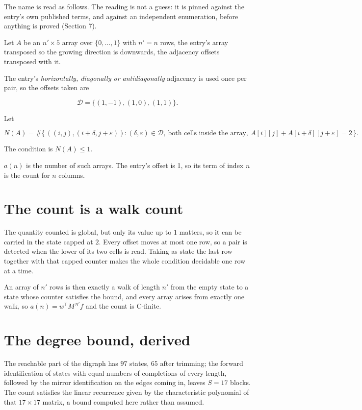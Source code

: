 \documentclass[11pt]{article}
\theoremstyle{definition}
\begin{document}
The name is read as follows. The reading is not a guess: it is pinned against the entry's own published terms, and against an independent enumeration, before anything is proved (Section 7).

Let $A$ be an $n' \times 5$ array over $\{0,\dots,1\}$ with $n' = n$ rows, the entry's array transposed so the growing direction is downwards, the adjacency offsets transposed with it.

The entry's {\itshape horizontally, diagonally or antidiagonally} adjacency is used once per pair, so the offsets taken are

\[\mathcal{D} = \{(1,-1), (1,0), (1,1)\}.\]

Let

\[N(A) = \#\bigl\{\,((i,j),(i{+}\delta,j{+}\varepsilon)) : (\delta,\varepsilon) \in \mathcal{D},\ \text{both cells inside the array},\ A[i][j] + A[i{+}\delta][j{+}\varepsilon] = 2\,\bigr\}.\]

The condition is $N(A) \le 1$.

$a(n)$ is the number of such arrays. The entry's offset is 1, so its term of index $n$ is the count for $n$ columns.

\section{The count is a walk count}

The quantity counted is global, but only its value up to $1$ matters, so it can be carried in the state capped at $2$. Every offset moves at most one row, so a pair is detected when the lower of its two cells is read. Taking as state the last row together with that capped counter makes the whole condition decidable one row at a time.

An array of $n'$ rows is then exactly a walk of length $n'$ from the empty state to a state whose counter satisfies the bound, and every array arises from exactly one walk, so $a(n) = w^{\mathsf T}M^{\,n'}f$ and the count is C-finite.

\section{The degree bound, derived}

The reachable part of the digraph has $97$ states, $65$ after trimming; the forward identification of states with equal numbers of completions of every length, followed by the mirror identification on the edges coming in, leaves $S = 17$ blocks. The count satisfies the linear recurrence given by the characteristic polynomial of that $17\times17$ matrix, a bound computed here rather than assumed.
\end{document}
